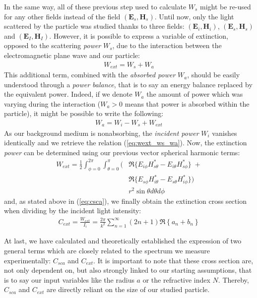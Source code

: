 \documentclass{article}
\numberwithin{equation}{section}
\begin{document}
In the same way, all of these previous step used to calculate $W_{s}$ might be re-used for any other fields instead of the field $(\textbf{E}_{s}, \textbf{H}_{s})$. Until now, only the light scattered by the particle was studied thanks to three fields: $(\textbf{E}_{i}, \textbf{H}_{i})$, $(\textbf{E}_{s}, \textbf{H}_{s})$ and $(\textbf{E}_{I}, \textbf{H}_{I})$. However, it is possible to express a variable of extinction, opposed to the scattering \textit{power} $W_{s}$, due to the interaction between the electromagnetic plane wave and our particle:
\begin{align}\label{eq:wext_ws_wa}
W_{ext} = W_{s} + W_{a}
\end{align}
This additional term, combined with the \textit{absorbed power} $W_{a}$, should be easily understood through a \textit{power balance}, that is to say an energy balance replaced by the equivalent power. Indeed, if we denote $W_{a}$ the amount of power which was varying during the interaction ($W_{a} > 0$ means that power is absorbed within the particle), it might be possible to write the following:
\begin{align}
W_{a} = W_{i} - W_{s} + W_{ext}
\end{align}
As our background medium is nonabsorbing, the \textit{incident power} $W_{i}$ vanishes identically and we retrieve the relation (\ref{eq:wext_ws_wa}). Now, the extinction \textit{power} can be determined using our previous vector spherical harmonic terms:
\begin{equation}
\begin{aligned}
W_{ext}=\frac{1}{2}\int_{\phi=0}^{2\pi}\int_{\theta=0}^{\pi} (&\Re\{E_{i\phi}H^{*}_{s\theta} - E_{i\theta}H^{*}_{s\phi}\}\; +\\
&\Re\{E_{s\phi}H^{*}_{i\theta} - E_{s\theta}H^{*}_{i\phi}\}) \\
&r^{2}\sin\theta d\theta d\phi
\end{aligned}
\end{equation}
and, as stated above in (\ref{eq:csca}), we finally obtain the extinction cross section when dividing by the incident light intensity:
\begin{align}\label{eq:cext}
C_{ext}=\frac{W_{ext}}{I_{i}}=\frac{2\pi}{k^{2}}\sum_{n=1}^{\infty }(2n+1)\Re\left\{a_{n} + b_{n} \right\}
\end{align}

At last, we have calculated and theoretically established the expression of two general terms which are closely related to the spectrum we measure experimentally: $C_{sca}$ and $C_{ext}$. It is important to note that these cross section are, not only dependent on, but also strongly linked to our starting assumptions, that is to say our input variables like the radius $a$ or the refractive index $N$. Thereby, $C_{sca}$ and $C_{ext}$ are directly reliant on the size of our studied particle.
\end{document}
